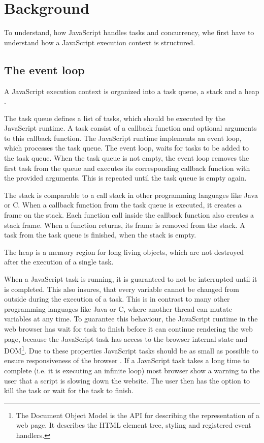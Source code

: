 \documentclass[article,type=bsc,colorback,accentcolor=tud9c]{tudthesis}
\begin{document}
  
  \newpage
  \section{Background}

  To understand, how JavaScript handles tasks and concurrency, whe first have to understand how a JavaScript execution context is structured.

  \subsection{The event loop}

  A JavaScript execution context is organized into a task queue, a stack and a heap \autocite{mdn-event-loop}.

  The task queue defines a list of tasks, which should be executed by the JavaScript runtime. A task consist of a callback function and optional arguments to this callback function. The JavaScript runtime implements an event loop, which processes the task queue. The event loop, waits for tasks to be added to the task queue. When the task queue is not empty, the event loop removes the first task from the queue and executes its corresponding callback function with the provided arguments. This is repeated until the task queue is empty again.

  The stack is comparable to a call stack in other programming languages like Java or C. When a callback function from the task queue is executed, it creates a frame on the stack. Each function call inside the callback function also creates a stack frame. When a function returns, its frame is removed from the stack. A task from the task queue is finished, when the stack is empty.

  The heap is a memory region for long living objects, which are not destroyed after the execution of a single task.

  When a JavaScript task is running, it is guaranteed to not be interrupted until it is completed. This also insures, that every variable cannot be changed from outside during the execution of a task. This is in contrast to many other programming languages like Java or C, where another thread can mutate variables at any time. To guarantee this behaviour, the JavaScript runtime in the web browser has wait for task to finish before it can continue rendering the web page, because the JavaScript task has access to the browser internal state and DOM\footnote{The Document Object Model is the API for describing the representation of a web page. It describes the HTML element tree, styling and registered event handlers.}. Due to these properties JavaScript tasks should be as small as possible to ensure responsiveness of the browser \cite{chrome-rail-model}. If a JavaScript task takes a long time to complete (i.e. it is executing an infinite loop) most browser show a warning to the user that a script is slowing down the website. The user then has the option to kill the task or wait for the task to finish.
\end{document}
